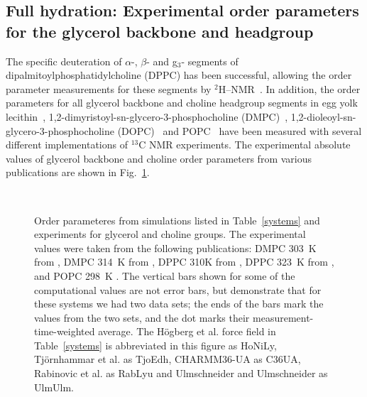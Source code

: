 \documentclass[pre,aps,floatfix,authordate1-4,twocolumn]{revtex4-1}
\begin{document}
\subsection{Full hydration: Experimental order parameters for the glycerol backbone and headgroup}\label{experiments}
The specific deuteration of $\alpha$-, $\beta$- and g$_3$- segments of dipalmitoylphosphatidylcholine (DPPC) has been successful, 
allowing the order parameter measurements for these segments by $^2$H--NMR~\cite{gally75,brown77,brown78,akutsu81}.
In addition, the order parameters for all glycerol backbone and choline headgroup segments in egg yolk lecithin~\cite{hong95a},
1,2-dimyristoyl-sn-glycero-3-phosphocholine (DMPC)~\cite{hong95b,gross97,dvinskikh05a}, 
1,2-dioleoyl-sn-glycero-3-phosphocholine (DOPC)~\cite{warschawski05} and POPC~\cite{warschawski05,ferreira13}
have been measured with several different implementations of $^{13}$C NMR experiments.
The experimental absolute values of glycerol backbone and choline order parameters from various publications are shown in Fig.~\ref{HGorderparameters}.
\begin{figure}[]
  \centering
 \\
  \caption{\label{HGorderparameters}
  Order parameteres from simulations listed in Table~\ref{systems} and experiments for glycerol and choline groups.
  The experimental values were taken from the following publications: DMPC 303~K from \cite{gross97}, DMPC 314~K from \cite{dvinskikh05a}, DPPC 310K from \cite{gally75}, 
  DPPC 323~K from \cite{akutsu81}, and POPC 298~K \cite{ferreira13}.
  The vertical bars shown for some of the computational values are not error bars, but demonstrate that for 
  these systems we had two data sets; the ends of the bars mark the values from the two sets, and the dot marks their measurement-time-weighted average. 
  The H{\"o}gberg et al. force field in Table~\ref{systems} is abbreviated in this figure as HoNiLy, Tj{\"o}rnhammar et al. as TjoEdh, CHARMM36-UA as C36UA,
  Rabinovic et al. as RabLyu and Ulmschneider and Ulmschneider as UlmUlm.
} 
\end{figure}
\end{document}
